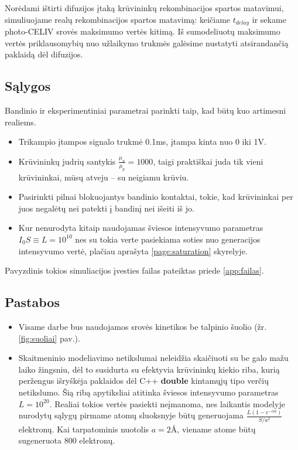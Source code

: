 Norėdami ištirti difuzijos įtaką krūvininkų rekombinacijos spartos matavimui, simuliuojame realų rekombinacijos spartos matavimą: keičiame \(t_{delay}\) ir sekame photo-CELIV srovės maksimumo vertės kitimą. Iš sumodeliuotų maksimumo vertės priklausomybių nuo užlaikymo trukmės galėsime nustatyti atsirandančią paklaidą dėl difuzijos.

\subsection{Sąlygos}
\label{page:params}
Bandinio ir eksperimentiniai parametrai parinkti taip, kad būtų kuo artimesni realiems.
\begin{itemize}
\item Trikampio įtampos signalo trukmė 0.1ms, įtampa kinta nuo 0 iki 1V.
\item Krūvininkų judrių santykis \(\frac{\mu_n}{\mu_p} = 1000\), taigi praktiškai juda tik vieni krūvininkai, mūsų atveju -- su neigiamu krūviu. 
\item Pasirinkti pilnai blokuojantys bandinio kontaktai, tokie, kad krūvininkai per juos negalėtų nei patekti į bandinį  nei išeiti iš jo.
\item Kur nenurodyta kitaip naudojamas šviesos intensyvumo parametras \(I_0 S \equiv L = 10^{10} \) nes su tokia verte pasiekiama soties nuo generacijos intensyvumo vertė, plačiau aprašyta \ref{page:saturation} skyrelyje.
\end{itemize}
Pavyzdinis tokios simuliacijos įvesties failas pateiktas priede \ref{app:failas}.

\subsection{Pastabos}
\label{page:specials}
\begin{itemize}
\item Visame darbe bus naudojamos srovės kinetikos be talpinio šuolio (žr. \ref{fig:suoliai} pav.).
\item Skaitmeninio modeliavimo netikslumai neleidžia skaičiuoti su be galo mažu laiko žingsniu, dėl to susidurta su efektyvia krūvininkų kiekio riba, kurią peržengus išryškėja paklaidos dėl C++ \textbf{double} kintamųjų tipo verčių netikslumo. Šią ribą apytiksliai atitinka šviesos intensyvumo parametras $L=10^{20}$. Realiai tokios vertės pasiekti neįmanoma, nes laikantis modelyje nurodytų sąlygų pirmame atomų sluoksnyje būtų generuojama $\frac{L (1-e^{-\alpha a})}{S/a^2}$ elektronų. Kai tarpatominis nuotolis $a = 2$\AA, viename atome būtų sugeneruota $800$ elektronų.
\end{itemize}